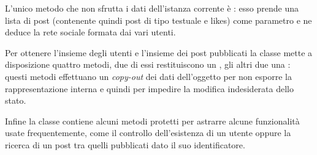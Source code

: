L'unico metodo che non sfrutta i dati dell'istanza corrente è : esso prende una lista di post (contenente quindi post di tipo testuale e likes) come parametro e ne deduce la rete sociale formata dai vari utenti.

Per ottenere l'insieme degli utenti e l'insieme dei post pubblicati la classe mette a disposizione quattro metodi, due di essi restituiscono un , gli altri due una : questi metodi effettuano un \emph{copy-out} dei dati dell'oggetto per non esporre la rappresentazione interna e quindi per impedire la modifica indesiderata dello stato.

Infine la classe  contiene alcuni metodi protetti per astrarre alcune funzionalità usate frequentemente, come il controllo dell'esistenza di un utente oppure la ricerca di un post tra quelli pubblicati dato il suo identificatore.